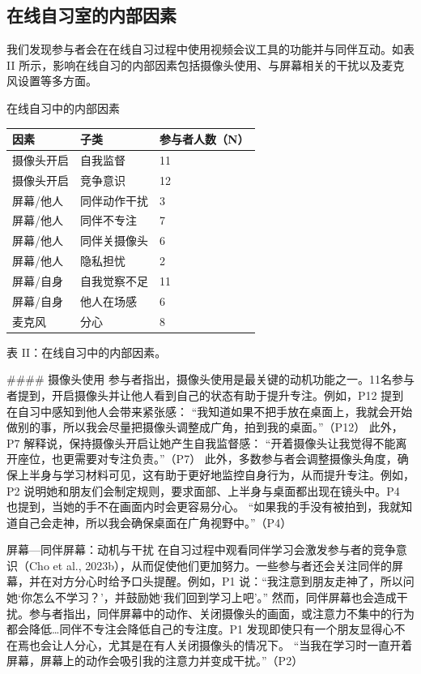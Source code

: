 \documentclass[12pt]{ctexart}
\begin{document}
\subsection{在线自习室的内部因素}
我们发现参与者会在在线自习过程中使用视频会议工具的功能并与同伴互动。如表 II 所示，影响在线自习的内部因素包括摄像头使用、与屏幕相关的干扰以及麦克风设置等多方面。

在线自习中的内部因素
\begin{table}[H]
\centering
\small
\begin{tabular}{lll}
\toprule
因素 & 子类 & 参与者人数（N） \\
\midrule
摄像头开启 & 自我监督 & 11 \\
摄像头开启 & 竞争意识 & 12 \\
屏幕/他人 & 同伴动作干扰 & 3 \\
屏幕/他人 & 同伴不专注 & 7 \\
屏幕/他人 & 同伴关摄像头 & 6 \\
屏幕/他人 & 隐私担忧 & 2 \\
屏幕/自身 & 自我觉察不足 & 11 \\
屏幕/自身 & 他人在场感 & 6 \\
麦克风 & 分心 & 8 \\
\bottomrule
\end{tabular}
\end{table}
表 II：在线自习中的内部因素。

\#\#\#\# 摄像头使用
参与者指出，摄像头使用是最关键的动机功能之一。11名参与者提到，开启摄像头并让他人看到自己的状态有助于提升专注。例如，P12 提到在自习中感知到他人会带来紧张感：
“我知道如果不把手放在桌面上，我就会开始做别的事，所以我会尽量把摄像头调整成广角，拍到我的桌面。”（P12）
此外，P7 解释说，保持摄像头开启让她产生自我监督感：
“开着摄像头让我觉得不能离开座位，也更需要对专注负责。”（P7）
此外，多数参与者会调整摄像头角度，确保上半身与学习材料可见，这有助于更好地监控自身行为，从而提升专注。例如，P2 说明她和朋友们会制定规则，要求面部、上半身与桌面都出现在镜头中。P4 也提到，当她的手不在画面内时会更容易分心。
“如果我的手没有被拍到，我就知道自己会走神，所以我会确保桌面在广角视野中。”（P4）

屏幕—同伴屏幕：动机与干扰
在自习过程中观看同伴学习会激发参与者的竞争意识（Cho et al., 2023b），从而促使他们更加努力。一些参与者还会关注同伴的屏幕，并在对方分心时给予口头提醒。例如，P1 说：“我注意到朋友走神了，所以问她‘你怎么不学习？’，并鼓励她‘我们回到学习上吧’。”
然而，同伴屏幕也会造成干扰。参与者指出，同伴屏幕中的动作、关闭摄像头的画面，或注意力不集中的行为都会降低…同伴不专注会降低自己的专注度。P1 发现即使只有一个朋友显得心不在焉也会让人分心，尤其是在有人关闭摄像头的情况下。
“当我在学习时一直开着屏幕，屏幕上的动作会吸引我的注意力并变成干扰。”（P2）
\end{document}
